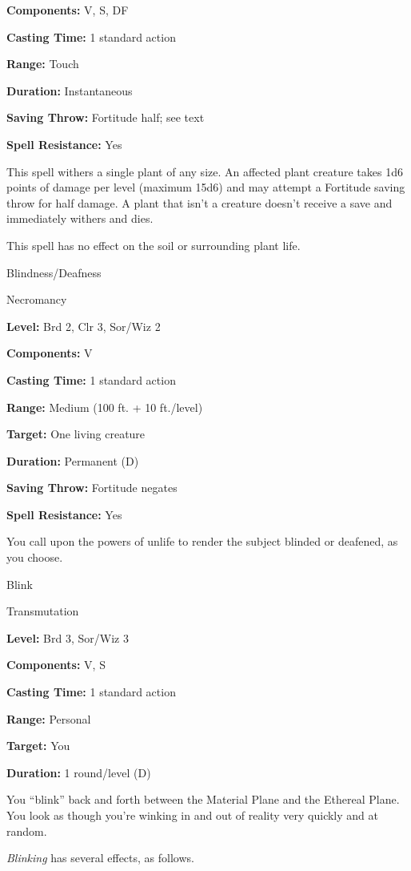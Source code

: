 \documentclass{article}
\begin{document}
\textbf{Components:} V, S, DF

\textbf{Casting Time:} 1 standard action

\textbf{Range:} Touch

\textbf{Duration:} Instantaneous

\textbf{Saving Throw:} Fortitude half; see text

\textbf{Spell Resistance:} Yes

This spell withers a single plant of any size. An affected plant creature takes 
1d6 points of damage per level (maximum 15d6) and may attempt a Fortitude saving 
throw for half damage. A plant that isn't a creature doesn't receive a save and 
immediately withers and dies.

This spell has no effect on the soil or surrounding plant life.

\vspace{12pt}
Blindness/Deafness

Necromancy

\textbf{Level:} Brd 2, Clr 3, Sor/Wiz 2

\textbf{Components:} V

\textbf{Casting Time:} 1 standard action

\textbf{Range: }Medium (100 ft. + 10 ft./level)

\textbf{Target:} One living creature

\textbf{Duration:} Permanent (D)

\textbf{Saving Throw:} Fortitude negates

\textbf{Spell Resistance:} Yes

You call upon the powers of unlife to render the subject blinded or deafened, as 
you choose.

\vspace{12pt}
Blink

Transmutation

\textbf{Level:} Brd 3, Sor/Wiz 3

\textbf{Components:} V, S

\textbf{Casting Time:} 1 standard action

\textbf{Range:} Personal

\textbf{Target:} You

\textbf{Duration:} 1 round/level (D)

You ``blink'' back and forth between the Material Plane and the Ethereal Plane. 
You look as though you're winking in and out of reality very quickly and at random.

\textit{Blinking }has several effects, as follows.
\end{document}
